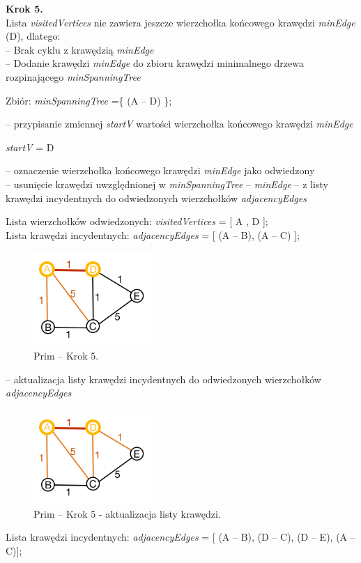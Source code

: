 \textbf{Krok 5.}\\
Lista \emph{visitedVertices} nie zawiera jeszcze wierzchołka końcowego krawędzi \emph{minEdge} (D), dlatego:\\
-- Brak cyklu z krawędzią \emph{minEdge}\\
-- Dodanie krawędzi \emph{minEdge} do zbioru krawędzi minimalnego drzewa rozpinającego \emph{minSpanningTree}
 \begin{center}
Zbiór: \emph{minSpanningTree} =\{ (A -- D) \};
 \end{center}
-- przypisanie zmiennej \emph{startV} wartości wierzchołka końcowego krawędzi \emph{minEdge}
\begin{center}
	\emph{startV} = D
\end{center}
-- oznaczenie wierzchołka końcowego krawędzi \emph{minEdge } jako odwiedzony \\
-- usunięcie krawędzi uwzględnionej w \emph{minSpanningTree} -- \emph{minEdge} -- z listy krawędzi incydentnych do odwiedzonych wierzchołków \emph{adjacencyEdges}

\begin{center}
Lista wierzchołków odwiedzonych: \emph{visitedVertices} = [ A , D ];\\
Lista krawędzi incydentnych: \emph{adjacencyEdges} = [ (A -- B), (A -- C) ];\\
\end{center}
\begin{figure}[htb!]
	\centering
	\includegraphics[width=0.4\textwidth]{tex/fig/graf4}
	\caption{Prim -- Krok 5.}
	\label{fig: g4}
\end{figure}
-- aktualizacja listy krawędzi incydentnych do odwiedzonych wierzchołków \emph{adjacencyEdges}
\begin{figure}[htb!]
	\centering
	\includegraphics[width=0.4\textwidth]{tex/fig/graf5}
	\caption{Prim -- Krok 5 - aktualizacja listy krawędzi.}
	\label{fig: g5}
\end{figure}
\begin{center}
	Lista krawędzi incydentnych: \emph{adjacencyEdges} = [ (A -- B), (D -- C), (D -- E), (A -- C)];\\
\end{center}

